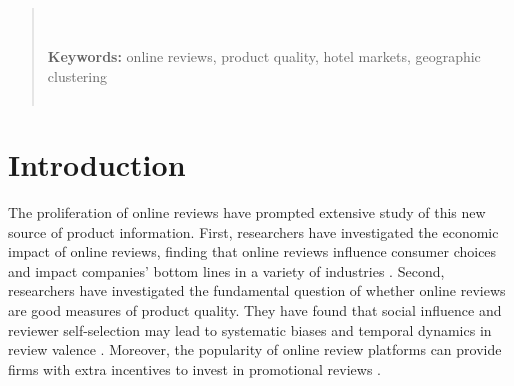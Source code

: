 \documentclass[12pt, leqno]{article}
\begin{document}
\begin{titlepage}
\begin{abstract}
\noindent \\
\vspace{0in}\\
\noindent\textbf{Keywords:} online reviews, product quality, hotel markets, geographic clustering\\
\vspace{0in}\\

\bigskip
\end{abstract}
\setcounter{page}{0}
\thispagestyle{empty}
\end{titlepage}
\pagebreak \newpage



\doublespacing


\section*{Introduction} \label{sec:introduction}

The proliferation of online reviews have prompted extensive study of this new source of product information. First, researchers have investigated the economic impact of online reviews, finding that online reviews influence consumer choices and impact companies' bottom lines in a variety of industries \citep{luca2011reviews,hollenbeck2018}. Second, researchers have investigated the fundamental question of whether online reviews are good measures of product quality. They have found that social influence and reviewer self-selection may lead to systematic biases and temporal dynamics in review valence \citep{hu2006can, moe2012online, mcauley2013amateurs}. Moreover, the popularity of online review platforms can provide firms with extra incentives to invest in promotional reviews \citep{mayzlin2014promotional}. 
\end{document}
